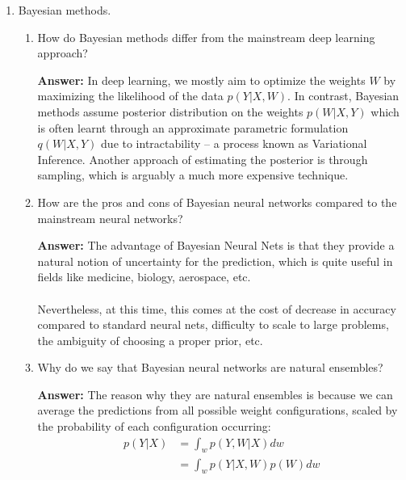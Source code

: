 \documentclass{article}
\newenvironment{QandA}{\begin{enumerate}[label=\arabic*.]}{\end{enumerate}}
\newenvironment{InnerQandA}{\begin{enumerate}[label=\roman*.]}{\end{enumerate}}
\newenvironment{answer}{\par\normalfont \textbf{Answer:}}{}
\newcommand{\g}{\vert}
\begin{document}
\begin{QandA}
    \item Bayesian methods.
    \begin{InnerQandA}
        \item How do Bayesian methods differ from the mainstream deep learning approach?
        \begin{answer}
            In deep learning, we mostly aim to optimize the weights $W$ by maximizing the likelihood of the data $p(Y \g X, W)$. In contrast, Bayesian methods assume posterior distribution on the weights $p(W \g X, Y)$ which is often learnt through an approximate parametric formulation $q(W \g X, Y)$ due to intractability -- a process known as Variational Inference. Another approach of estimating the posterior is through sampling, which is arguably a  much more expensive technique.
        \end{answer}

        \item How are the pros and cons of Bayesian neural networks compared to the mainstream neural networks?
        \begin{answer}
            The advantage of Bayesian Neural Nets is that they provide a natural notion of uncertainty for the prediction, which is quite useful in fields like medicine, biology, aerospace, etc.\\\\
            Nevertheless, at this time, this comes at the cost of decrease in accuracy compared to standard neural nets, difficulty to scale to large problems, the ambiguity of choosing a proper prior, etc.
        \end{answer}

        \item Why do we say that Bayesian neural networks are natural ensembles?
        \begin{answer}
            The reason why they are natural ensembles is because we can average the predictions from all possible weight configurations, scaled by the probability of each configuration occurring:
            \begin{align*}
                p(Y \g X) &= \int_w p(Y, W \g X) dw \\
                &= \int_w p(Y \g X, W) p(W) dw
            \end{align*}
        \end{answer}
    \end{InnerQandA}


\end{QandA}
\end{document}
